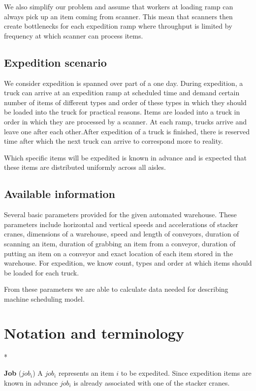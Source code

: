 \documentclass{ctuthesis}
\begin{document}
We also simplify our problem and assume that workers at loading ramp can always pick up an item coming from scanner. This mean that scanners then create bottlenecks for each expedition ramp where throughput is limited by frequency at which scanner can process items.

\subsection{Expedition scenario}

We consider expedition is spanned over part of a one day. During expedition, a truck can arrive at an expedition ramp at scheduled time and demand certain number of items of different types and order of these types in which they should be loaded into the truck for practical reasons. Items are loaded into a truck in order in which they are processed by a scanner. At each ramp, trucks arrive and leave one after each other.After expedition of a truck is finished, there is reserved time after which the next truck can arrive to correspond more to reality. 

Which specific items will be expedited is known in advance and is expected that these items are distributed uniformly across all aisles.


\subsection{Available information}
Several basic parameters provided for the given automated warehouse. These parameters include horizontal and vertical speeds and accelerations of stacker cranes, dimensions of a warehouse, speed and length of conveyors, duration of scanning an item, duration of grabbing an item from a conveyor, duration of putting an item on a conveyor and exact location of each item stored in the warehouse. For expedition, we know count, types and order at which items should be loaded for each truck. 

From these parameters we are able to calculate data needed for describing machine scheduling model.

\section{Notation and terminology}*

\noindent \textbf{Job} ($job_i$) A $job_i$ represents an item $i$ to be expedited. Since expedition items are known in advance $job_i$ is already associated with one of the stacker cranes. 
\end{document}
